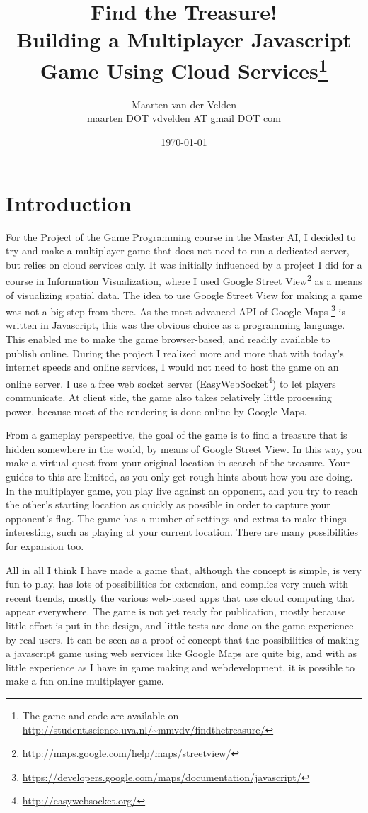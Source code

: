 \documentclass[a4paper,10pt]{article}
\title{Find the Treasure!\\Building a Multiplayer Javascript Game Using Cloud Services\footnote{The game and code are available on \url{http://student.science.uva.nl/\~mmvdv/findthetreasure/}}}
\author{Maarten van der Velden\\maarten DOT vdvelden AT gmail DOT com}
\date{\today}
\begin{document}
\maketitle

\section{Introduction} %
\label{sec:introduction}
For the Project of the Game Programming course in the Master AI, I decided to  try and make a multiplayer game that does not need to run a dedicated server, but relies on cloud services only. It was initially influenced by a project I did for a course in Information Visualization, where I used Google Street View\footnote{\url{http://maps.google.com/help/maps/streetview/}} as a means of visualizing spatial data. The idea to use Google Street View for making a game was not a big step from there. As the most advanced API of Google Maps \footnote{\url{https://developers.google.com/maps/documentation/javascript/}} is written in Javascript, this was the obvious choice as a programming language. This enabled me to make the game browser-based, and readily available to publish
online. During the project I realized more and more that with today's internet speeds and online services, I would not need to host the game on an online server. I use a free web socket server (EasyWebSocket\footnote{ \url{http://easywebsocket.org/}}) to let players communicate. At client side, the game also takes relatively little processing power, because most of the rendering is done online by Google Maps.

From a gameplay perspective, the goal of the game is to find a treasure that is hidden somewhere in the world, by means of Google Street View. In this way, you make a  virtual quest from your original location in search of the treasure. Your guides to this are limited, as you only get rough hints about how you are doing. In the multiplayer game, you play live against an opponent, and you try to reach the other's starting location as quickly as possible in order to capture your opponent's flag. The game has a number of settings and extras to make things interesting, such as playing at your current location. There are many possibilities for expansion too.

All in all I think I have made a game that, although the concept is simple, is very fun to play, has lots of possibilities for extension, and complies very much with recent trends, mostly the various web-based apps that use cloud computing that appear everywhere. The game is not yet ready for publication, mostly because little effort is put in the design, and little tests are done on the game experience by real users. It can be seen as a proof of concept that the possibilities of making a javascript game using web services like Google Maps are quite big, and with as little experience as I have in game making and webdevelopment, it is possible to make a fun online multiplayer game.
\end{document}
